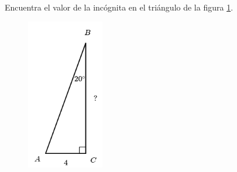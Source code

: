 \question[15]  Encuentra el valor de la incógnita en el triángulo de la figura \ref{fig:lados_functrig_29}.
\begin{figure}[H]
    \begin{center}
        \includegraphics[width=0.3\textwidth]{../images/lados_functrig_29.png}
    \end{center}
    \caption{}
    \label{fig:lados_functrig_29}
\end{figure}